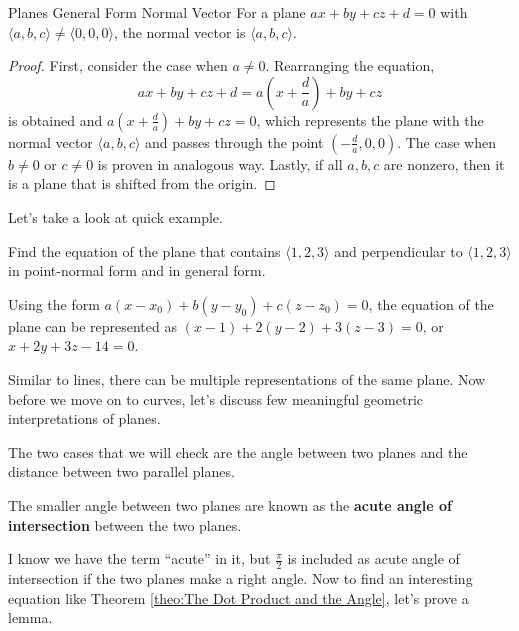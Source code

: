 \documentclass[../../main.tex]{subfiles}
\begin{document}
\begin{theorem}{}{Planes General Form Normal Vector}
For a plane $ax + by + cz + d = 0$ with $\langle a, b, c \rangle
\neq \langle 0, 0, 0 \rangle$, the normal vector is
$\langle a, b, c \rangle$.
\end{theorem}
\begin{proof}
First, consider the case when $a \neq 0$. Rearranging the equation,
\[
ax + by + cz + d
= a \left( x + \frac{d}{a} \right) + by + cz
\]
is obtained and $a \left( x + \frac{d}{a} \right) + by + cz = 0$,
which represents the plane with the normal vector
$\langle a, b, c \rangle$ and passes through the point
$(-\frac{d}{a}, 0, 0)$. The case when $b \neq 0$ or $c \neq 0$
is proven in analogous way. Lastly, if all $a, b, c$ are nonzero,
then it is a plane that is shifted from the origin.
\end{proof}

Let's take a look at quick example.

\begin{problem}{}{}
Find the equation of the plane that contains $\langle 1, 2, 3 \rangle$
and perpendicular to $\langle 1, 2, 3 \rangle$ in point-normal form
and in general form.
\end{problem}
\begin{solution}
Using the form $a(x - x_0) + b(y - y_0) + c(z - z_0) = 0$,
the equation of the plane can be represented as
$(x - 1) + 2(y - 2) + 3(z - 3) = 0$, or $x + 2y + 3z - 14 = 0$.
\end{solution}

Similar to lines, there can be multiple representations of the
same plane. Now before we move on to curves, let's discuss few
meaningful geometric interpretations of planes.

The two cases that we will check are the angle between two planes
and the distance between two parallel planes.

\begin{definition}{}{}
The smaller angle between two planes are known as the \textbf{acute
angle of intersection} between the two planes.
\end{definition}

I know we have the term ``acute'' in it, but $\frac{\pi}{2}$ is
included as acute angle of intersection if the two planes make
a right angle. Now to find an interesting equation like Theorem
\ref{theo:The Dot Product and the Angle}, let's prove a lemma.
\end{document}
